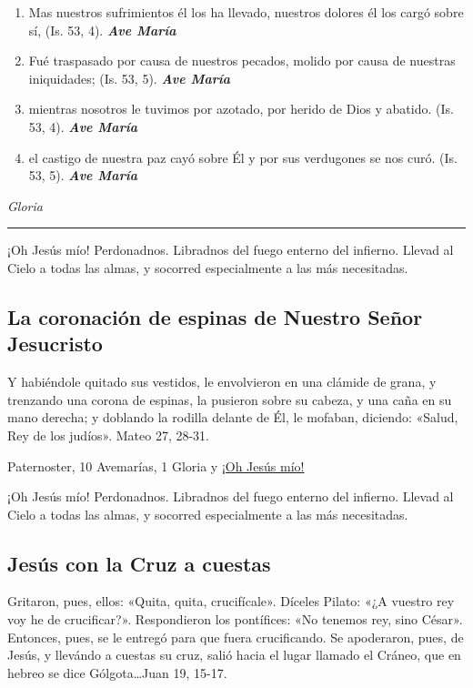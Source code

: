 \documentclass[a4paper,11pt, oneside]{report}
\begin{document}
{{\begin{enumerate}
        \item Mas nuestros sufrimientos él los ha llevado, nuestros dolores él los cargó sobre sí, (Is. 53, 4). \textbf{\textit{Ave María}}

        \item Fué traspasado por causa de nuestros pecados, molido por causa de nuestras iniquidades; (Is. 53, 5). \textbf{\textit{Ave María}}

        \item mientras nosotros le tuvimos por azotado, por herido de Dios y abatido. (Is. 53, 4). \textbf{\textit{Ave María}}

        \item el castigo de nuestra paz cayó sobre Él y por sus verdugones se nos curó. (Is. 53, 5). \textbf{\textit{Ave María}}

      \end{enumerate}

      \indent\textit{Gloria} \par

      \begin{center}\rule{1\linewidth}{\linethickness}\end{center}
    
      \medskip
      \hypertarget{finalFlagelacion}{¡Oh Jesús mío! Perdonadnos. Libradnos del fuego enterno del infierno. Llevad al Cielo a todas las almas, y socorred especialmente a las más 
      necesitadas.}
    }

  
  \subsection*{La coronación de espinas de Nuestro Señor Jesucristo}
    {
      Y habiéndole quitado sus vestidos, le envolvieron en una clámide de grana, y trenzando una corona de espinas, la pusieron sobre su cabeza, y una
      caña en su mano derecha; y doblando la rodilla delante de Él, le mofaban, diciendo: «Salud, Rey de los judíos». Mateo 27, 28-31.
      
       Paternoster, 10 Avemarías, 1 Gloria y \hyperlink{finalCoronacion}{¡Oh Jesús mío!}
      
      \medskip
      \hypertarget{finalCoronacion}{¡Oh Jesús mío! Perdonadnos. Libradnos del fuego enterno del infierno. Llevad al Cielo a todas las almas, y socorred especialmente a las más 
      necesitadas.}
    }

  \subsection*{Jesús con la Cruz a cuestas}
    {
      Gritaron, pues, ellos: «Quita, quita, crucifícale». Díceles Pilato: «¿A vuestro rey voy he de crucificar?». Respondieron los pontífices: «No tenemos rey,
      sino César». Entonces, pues, se le entregó para que fuera crucificando. Se apoderaron, pues, de Jesús, y llevándo a cuestas su cruz, salió hacia el lugar
      llamado el Cráneo, que en hebreo se dice Gólgota\ldots Juan 19, 15-17.

}}
\end{document}
